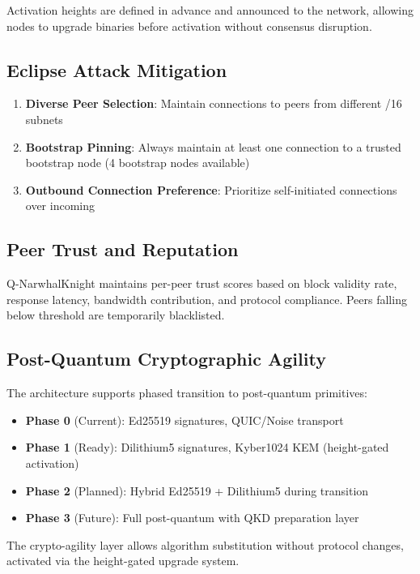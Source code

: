 \documentclass[11pt,a4paper]{article}
\begin{document}
Activation heights are defined in advance and announced to the network, allowing nodes to upgrade binaries before activation without consensus disruption.

\subsection{Eclipse Attack Mitigation}

\begin{enumerate}
    \item \textbf{Diverse Peer Selection}: Maintain connections to peers from different /16 subnets
    \item \textbf{Bootstrap Pinning}: Always maintain at least one connection to a trusted bootstrap node (4 bootstrap nodes available)
    \item \textbf{Outbound Connection Preference}: Prioritize self-initiated connections over incoming
\end{enumerate}

\subsection{Peer Trust and Reputation}

Q-NarwhalKnight maintains per-peer trust scores based on block validity rate, response latency, bandwidth contribution, and protocol compliance. Peers falling below threshold are temporarily blacklisted.

\subsection{Post-Quantum Cryptographic Agility}

The architecture supports phased transition to post-quantum primitives:

\begin{itemize}
    \item \textbf{Phase 0} (Current): Ed25519 signatures, QUIC/Noise transport
    \item \textbf{Phase 1} (Ready): Dilithium5 signatures, Kyber1024 KEM (height-gated activation)
    \item \textbf{Phase 2} (Planned): Hybrid Ed25519 + Dilithium5 during transition
    \item \textbf{Phase 3} (Future): Full post-quantum with QKD preparation layer
\end{itemize}

The crypto-agility layer allows algorithm substitution without protocol changes, activated via the height-gated upgrade system.
\end{document}
